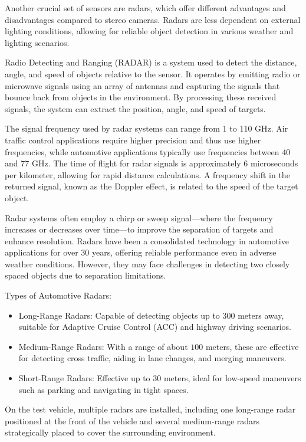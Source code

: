 Another crucial set of sensors are radars, which offer different advantages and disadvantages compared to stereo cameras. Radars are less dependent on external lighting conditions, allowing for reliable object detection in various weather and lighting scenarios.

Radio Detecting and Ranging (RADAR) is a system used to detect the distance, angle, and speed of objects relative to the sensor. It operates by emitting radio or microwave signals using an array of antennas and capturing the signals that bounce back from objects in the environment. By processing these received signals, the system can extract the position, angle, and speed of targets.

The signal frequency used by radar systems can range from 1 to 110 GHz. Air traffic control applications require higher precision and thus use higher frequencies, while automotive applications typically use frequencies between 40 and 77 GHz. The time of flight for radar signals is approximately 6 microseconds per kilometer, allowing for rapid distance calculations. A frequency shift in the returned signal, known as the Doppler effect, is related to the speed of the target object.

Radar systems often employ a chirp or sweep signal—where the frequency increases or decreases over time—to improve the separation of targets and enhance resolution. Radars have been a consolidated technology in automotive applications for over 30 years, offering reliable performance even in adverse weather conditions. However, they may face challenges in detecting two closely spaced objects due to separation limitations.

Types of Automotive Radars:
\begin{itemize}
    \item Long-Range Radars: Capable of detecting objects up to 300 meters away, suitable for Adaptive Cruise Control (ACC) and highway driving scenarios.
    \item Medium-Range Radars: With a range of about $100$ meters, these are effective for detecting cross traffic, aiding in lane changes, and merging maneuvers.
    \item Short-Range Radars: Effective up to 30 meters, ideal for low-speed maneuvers such as parking and navigating in tight spaces.
\end{itemize}

On the test vehicle, multiple radars are installed, including one long-range radar positioned at the front of the vehicle and several medium-range radars strategically placed to cover the surrounding environment.

